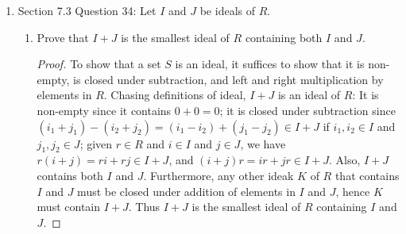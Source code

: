 \documentclass{article}
\begin{document}
\begin{enumerate}[label={\bf Q\arabic*:}]
\begin{enumerate}
      \item Prove that $p(x)$ is nilpotent in $R[x]$ if and only if
        $a_0,\ldots,a_n$ are nilpotent elements of $R$.
        \begin{proof}
          $\Leftarrow$: This follows directly from induction on $n$, using
          Question 29 of Section 7.3, where we showed that the sum or
          difference of two nilpotent elements is nilpotent. \\

          $\Rightarrow$: Assume $p(x)$ is nilpotent in $R[x]$. Then since
          the sum of a unit and a nilpotent element is unit (Question 14d
          of Section 7.1), $1+p(x)$ is unit. So from previous part of this
          question, we get $a_1,\ldots,a_n$ are nilpotent in $R$. It
          remains to show that $a_0$ is nilpotent. Since $p(x)^r=0$ for
          some $r\in\mathbb{N}$, the coefficient of $x^0$ of $p(x)^r=0$ is
          $a_0^r=0$, which implies that $a_0$ is nilpotent.
        \end{proof}
    \end{enumerate}

  \item Section 7.3 Question 34: Let $I$ and $J$ be ideals of $R$.
    \begin{enumerate}
      \item Prove that $I+J$ is the smallest ideal of $R$ containing both
        $I$ and $J$.
        \begin{proof}
          To show that a set $S$ is an ideal, it suffices to show that it
          is non-empty, is closed under subtraction, and left and right
          multiplication by elements in $R$. Chasing definitions of ideal,
          $I+J$ is an ideal of $R$: It is non-empty since it contains
          $0+0=0$; it is closed under subtraction since
          $(i_1+j_1)-(i_2+j_2)=(i_1-i_2)+(j_1-j_2)\in I+J$ if $i_1,i_2\in
          I$ and $j_1,j_2\in J$; given $r\in R$ and $i\in I$ and $j\in J$,
          we have $r(i+j)=ri+rj\in I+J$, and $(i+j)r=ir+jr\in I+J$.  Also,
          $I+J$ contains both $I$ and $J$. Furthermore, any other ideak $K$
          of $R$ that contains $I$ and $J$ must be closed under addition of
          elements in $I$ and $J$, hence $K$ must contain $I+J$. Thus $I+J$
          is the smallest ideal of $R$ containing $I$ and $J$.
        \end{proof}


\end{enumerate}
\end{enumerate}
\end{document}
